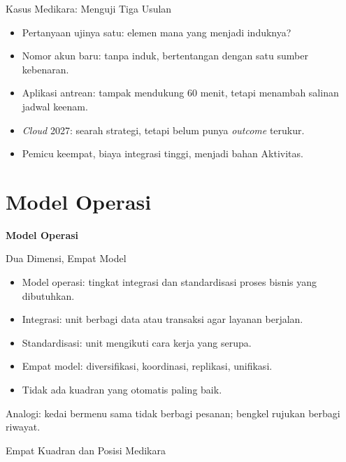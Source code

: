 \documentclass[aspectratio=169, table, 12pt]{beamer}
\begin{document}
\begin{frame}{{\Large Kasus Medikara: Menguji Tiga Usulan}}
  \vspace{10pt}
  \begin{itemize}
    \item Pertanyaan ujinya satu: elemen mana yang menjadi induknya?
    \item Nomor akun baru: tanpa induk, bertentangan dengan satu sumber kebenaran.
    \item Aplikasi antrean: tampak mendukung 60 menit, tetapi menambah salinan jadwal keenam.
    \item \textit{Cloud} 2027: searah strategi, tetapi belum punya \textit{outcome} terukur.
    \item Pemicu keempat, biaya integrasi tinggi, menjadi bahan Aktivitas.
  \end{itemize}
\end{frame}

\section{Model Operasi}

\begin{frame}{\hfill}
  \centering
  \Huge{\textbf{Model Operasi}}
\end{frame}

\begin{frame}{{\Large Dua Dimensi, Empat Model}}
  \vspace{10pt}
  \begin{itemize}
    \item Model operasi: tingkat integrasi dan standardisasi proses bisnis yang dibutuhkan.
    \item Integrasi: unit berbagi data atau transaksi agar layanan berjalan.
    \item Standardisasi: unit mengikuti cara kerja yang serupa.
    \item Empat model: diversifikasi, koordinasi, replikasi, unifikasi.
    \item Tidak ada kuadran yang otomatis paling baik.
  \end{itemize}
  \vspace{6pt}
  {\small Analogi: kedai bermenu sama tidak berbagi pesanan; bengkel rujukan berbagi riwayat.}
\end{frame}

\begin{frame}{{\Large Empat Kuadran dan Posisi Medikara}}
  \centering
\end{frame}
\end{document}
